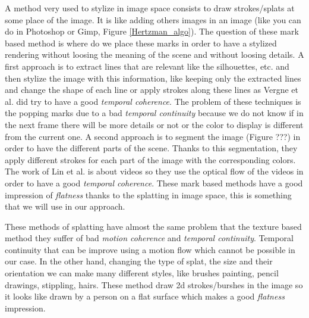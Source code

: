 A method very used to stylize in image space consists to draw strokes/splats at some place of the image\cite{bleron_motion-coherent_2018, vergne_implicit_2011, benard_active_nodate, zeng_image_2009, grabli_programmable_2010}. It is like adding others images in an image (like you can do in Photoshop or Gimp, Figure \ref{Hertzman_algo}). The question of these mark based method is where do we place these marks in order to have a stylized rendering without loosing the meaning of the scene and without loosing details. A first approach is to extract lines that are relevant like the silhouettes, etc. \cite{vergne_implicit_2011, grabli_programmable_2010, lee_line_nodate} and then stylize the image with this information, like keeping only the extracted lines and change the shape of each line or apply strokes along these lines as Vergne et al.\cite{vergne_implicit_2011} did try to have a good \textit{temporal coherence}. The problem of these techniques is the popping marks due to a bad \textit{temporal continuity} because we do not know if in the next frame there will be more details or not or the color to display is different from the current one.
A second approach is to segment the image (Figure ???) in order to have the different parts of the scene\cite{zeng_image_2009, lin_video_nodate}. Thanks to this segmentation, they apply different strokes for each part of the image with the corresponding colors. The work of Lin et al.\cite{lin_video_nodate} is about videos so they use the optical flow of the videos in order to have a good \textit{temporal coherence}. These mark based methods have a good impression of \textit{flatness} thanks to the splatting in image space, this is something that we will use in our approach.

These methods of splatting have almost the same problem that the texture based method they suffer of bad \textit{motion coherence} and \textit{temporal continuity}. Temporal continuity that can be improve using a motion flow which cannot be possible in our case. In the other hand, changing the type of splat, the size and their orientation we can make many different styles, like brushes painting, pencil drawings, stippling, hairs. These method draw 2d strokes/burshes in the image so it looks like drawn by a person on a flat surface which makes a good \textit{flatness} impression. \newline


